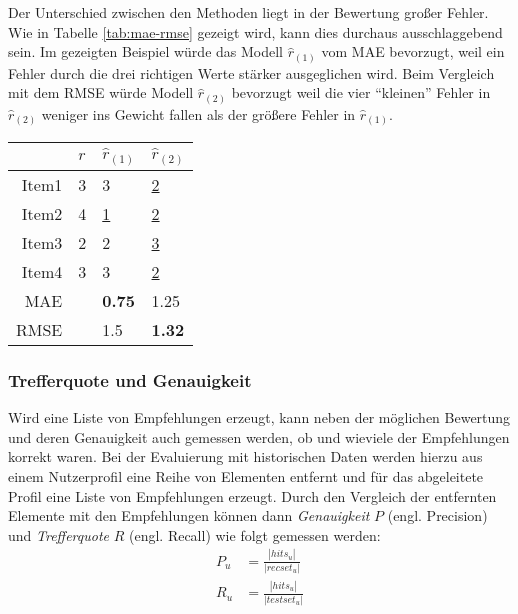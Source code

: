 Der Unterschied zwischen den Methoden liegt in der Bewertung großer Fehler. Wie in Tabelle \ref{tab:mae-rmse} gezeigt wird, kann dies durchaus ausschlaggebend sein. Im gezeigten Beispiel würde das Modell $\hat{r}_{(1)}$ vom \acs{MAE} bevorzugt, weil ein Fehler durch die drei richtigen Werte stärker ausgeglichen wird. Beim Vergleich mit dem \acs{RMSE} würde Modell $\hat{r}_{(2)}$ bevorzugt weil die vier ``kleinen'' Fehler in $\hat{r}_{(2)}$ weniger ins Gewicht fallen als der größere Fehler in $\hat{r}_{(1)}$. \citep{hb_08}
\begin{SCtable}
  \centering
  \begin{tabular}{ | r | p{1cm} | p{1cm} | p{1cm} | }
    \hline
    & $r$ & $\hat{r}_{(1)}$ & $\hat{r}_{(2)}$ \\ \hline
    Item1 & 3 & 3 & \underline{2} \\
    Item2 & 4 & \underline{1} & \underline{2} \\
    Item3 & 2 & 2 & \underline{3} \\
    Item4 & 3 & 3 & \underline{2} \\ \hline \hline
    MAE & & \textbf{0.75} & 1.25 \\
    RMSE & & 1.5 & \textbf{1.32} \\
    \hline
  \end{tabular}
  \caption[Beispielrechnung zum Vergleich von \acs{MAE} und \acs{RMSE}]{\footnotesize Beispielrechnung zum Vergleich von \acs{MAE} und \acs{RMSE} - gegenübergestellt sind tatsächliche Bewertungen $r$ und von zwei verschiedenen Quellen erzeugte angenommene Bewertungen $\hat{r}_{(1)}$ und $\hat{r}_{(2)}$. Abweichende Bewertungen sind unterstrichen. }
  \label{tab:mae-rmse}
\end{SCtable}

\subsubsection{Trefferquote und Genauigkeit}

Wird eine Liste von Empfehlungen erzeugt, kann neben der möglichen Bewertung und deren Genauigkeit auch gemessen werden, ob und wieviele der Empfehlungen korrekt waren. Bei der Evaluierung mit historischen Daten werden hierzu aus einem Nutzerprofil eine Reihe von Elementen entfernt und für das abgeleitete Profil eine Liste von Empfehlungen erzeugt. Durch den Vergleich der entfernten Elemente mit den Empfehlungen können dann \textit{Genauigkeit} $P$ (engl. Precision) und \textit{Trefferquote} $R$ (engl. Recall) wie folgt gemessen werden:
\begin{align}
P_u & = \frac{|hits_u|}{| recset_u | } \label{form:precision} \\
R_u & = \frac{|hits_u|}{ | testset_u | } \label{form:recall}
\end{align}

